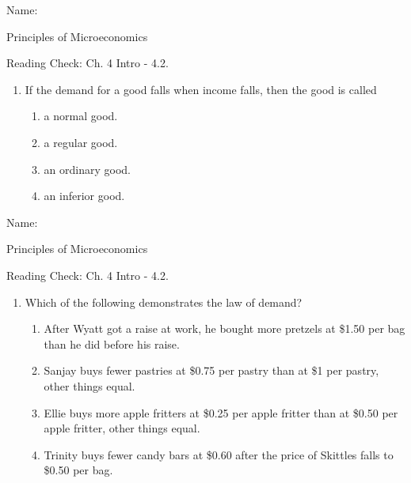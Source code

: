 \documentclass{article}
\begin{document}
\bigskip

Name: \underline{\phantom{xxxxxxxxxxxxxxxxxxxxxxxxxxxxxxxxxxxxxxxx}}

Principles of Microeconomics

Reading Check: Ch. 4 Intro - 4.2.

\begin{enumerate}

\item If the demand for a good falls when income falls, then the good is called

	\begin{enumerate}
	
	\item a normal good.
	
	\item a regular good.
	
	\item an ordinary good.
	
	\item an inferior good.
	
	\end{enumerate}

\end{enumerate}

\bigskip

Name: \underline{\phantom{xxxxxxxxxxxxxxxxxxxxxxxxxxxxxxxxxxxxxxxx}}

Principles of Microeconomics

Reading Check: Ch. 4 Intro - 4.2.

\begin{enumerate}

\item Which of the following demonstrates the law of demand?

	\begin{enumerate}
	
	\item After Wyatt got a raise at work, he bought more pretzels at \$1.50 per bag than he did before his raise.
	
	\item Sanjay buys fewer pastries at \$0.75 per pastry than at \$1 per pastry, other things equal.
	
	\item Ellie buys more apple fritters at \$0.25 per apple fritter than at \$0.50 per apple fritter, other things equal. 
	
	\item Trinity buys fewer candy bars at \$0.60 after the price of Skittles falls to \$0.50 per bag.
	
	\end{enumerate}

\end{enumerate}
\end{document}
